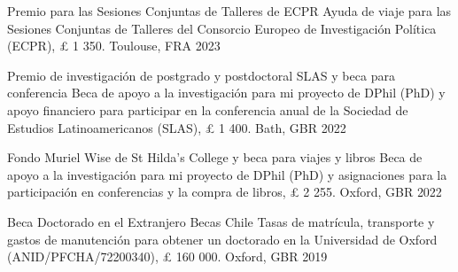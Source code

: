





\vspace{1mm}

\begin{cvhonors}
\cvhonor
{Premio para las Sesiones Conjuntas de Talleres de ECPR} 
{Ayuda de viaje para las Sesiones Conjuntas de Talleres del Consorcio Europeo de Investigación Política (ECPR), {\pounds} 1 350.}
{Toulouse, FRA}
{2023}
\end{cvhonors}

\vspace{1mm}

\begin{cvhonors}
\cvhonor
{Premio de investigación de postgrado y postdoctoral SLAS y beca para conferencia} 
{Beca de apoyo a la investigación para mi proyecto de DPhil (PhD) y apoyo financiero para participar en la conferencia anual de la Sociedad de Estudios Latinoamericanos (SLAS), {\pounds} 1 400.}
{Bath, GBR}
{2022}
\end{cvhonors}

\vspace{1mm}

\begin{cvhonors}
\cvhonor
{Fondo Muriel Wise de St Hilda's College y beca para viajes y libros} 
{Beca de apoyo a la investigación para mi proyecto de DPhil (PhD) y asignaciones para la participación en conferencias y la compra de libros, {\pounds} 2 255.} 
{Oxford, GBR}
{2022}
\end{cvhonors}

\vspace{1mm}

\begin{cvhonors}
\cvhonor
{Beca Doctorado en el Extranjero Becas Chile} 
{Tasas de matrícula, transporte y gastos de manutención para obtener un doctorado en la Universidad de Oxford (ANID/PFCHA/72200340), {\pounds} 160 000.}
{Oxford, GBR}
{2019}
\end{cvhonors}

\vspace{1mm}